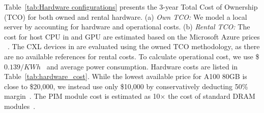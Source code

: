 \begin{table}[h]
\footnotesize
\centering
\caption{CXL Controller Custom Logic Area\&Power in 28nm}
    \label{tab:Area_and_power}    
\end{table}





\label{TCO}

Table~\ref{tab:Hardware configurations} presents the 3-year Total Cost of Ownership (TCO) for both owned and rental hardware. (a) \textit{Own TCO:} We model a local server by accounting for hardware and operational costs. (b) \textit{Rental TCO:} The cost for host CPU in \att{} and GPU are estimated based on the Microsoft Azure prices ~\cite{azure-price}. The CXL devices in \att{} are evaluated using the owned TCO methodology, as there are no available references for rental costs. To calculate operational cost, we use \$$0.139/KWh$~\cite{electricity-price} and average power consumption. Hardware costs are listed in Table~\ref{tab:hardware_cost}. While the lowest available price for A100 80GB is close to \$20,000, we instead use only \$10,000 by conservatively deducting 50\% margin~\cite{gpu-price}. The PIM module cost is estimated as 10$\times$ the cost of standard DRAM modules~\cite{pim-price, dram-price}.

